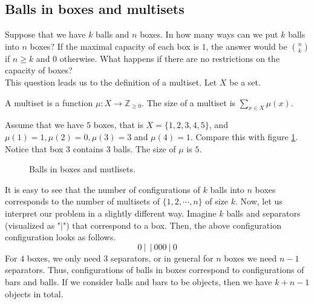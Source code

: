 \subsection{Balls in boxes and multisets}

Suppose that we have $k$ balls and $n$ boxes. In how many ways can we put $k$ balls into $n$ boxes? If the maximal capacity of each box is $1$, the answer would be 
$n \choose k$ if $n \geq k$ and $0$ otherwise. What happens if there are no restrictions on the capacity of boxes?
\\
This question leads us to the definition of a multiset. Let $X$ be a set.

\begin{defn}
A multiset is a function $\mu: X \to \mathbb{Z}_{\geq  0}$. The size of a multiset is $\sum_{x \in X} \mu (x)$.
\end{defn}

\begin{exmp}
Assume that we have $5$ boxes, that is $X=\{1, 2, 3, 4 ,5\}$, and $\mu(1)=1, \mu(2)=0, \mu(3)=3$ and $\mu(4)=1$. Compare this with figure \ref{fig:multisetboxesexample}. Notice that box $3$ contains 
$3$ balls. The size of $\mu$ is $5$.

\begin{figure}[ht]
    \centering
    \caption{Balls in boxes and mutlisets.}
    \label{fig:multisetboxesexample}
\end{figure}
\end{exmp}

It is easy to see that the number of configurations of $k$ balls into $n$ boxes corresponds to the number of multisets of $\{1,2,\cdots, n\}$
of size $k$. Now, let us interpret our problem in a slightly different way. Imagine $k$ balls and separators (visualized as "$|$") that correspond to a box. Then, the above configuration configuration 
looks as follows.
$$
0\ |\ \ |\ 000\ |\ 0
$$
For $4$ boxes, we only need $3$ separators, or in general for $n$ boxes we need $n-1$ separators. Thus, configurations of balls in boxes correspond to configurations of bars and balls.
If we consider balls and bars to be objects, then we have $k+n-1$ objects in total.


